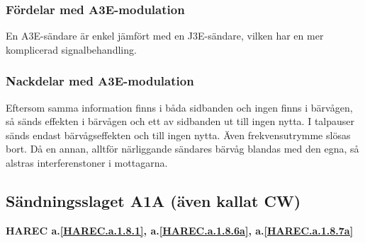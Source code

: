 \subsubsection{Fördelar med A3E-modulation}

En A3E-sändare är enkel jämfört med en J3E-sändare, vilken har en mer
komplicerad signalbehandling.

\subsubsection{Nackdelar med A3E-modulation}

Eftersom samma information finns i båda sidbanden och ingen finns i bärvågen,
så sänds effekten i bärvågen och ett av sidbanden ut till ingen nytta.
I talpauser sänds endast bärvågseffekten och till ingen nytta.
Även frekvensutrymme slösas bort.
Då en annan, alltför närliggande sändares bärvåg blandas med den egna, så
alstras interferenstoner i mottagarna.

\subsection{Sändningsslaget A1A (även kallat CW)}
\textbf{HAREC a.\ref{HAREC.a.1.8.1}, a.\ref{HAREC.a.1.8.6a}, a.\ref{HAREC.a.1.8.7a}\label{myHAREC.a.1.8.1}\label{myHAREC.a.1.8.6a}\label{myHAREC.a.1.8.7a}}

